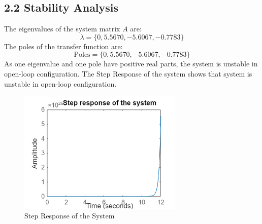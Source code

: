 \documentclass[a4paper,12pt]{article}
\begin{document}
\subsection*{2.2 Stability Analysis}
The eigenvalues of the system matrix \(A\) are:
\[
\lambda = \{0, 5.5670, -5.6067, -0.7783\}
\]
The poles of the transfer function are:
\[
\text{Poles} = \{0, 5.5670, -5.6067, -0.7783\}
\]
As one eigenvalue and one pole have positive real parts, the system is unstable in open-loop configuration.
The Step Response of the system shows that system is unstable in open-loop configuration.
\begin{figure}[h!]
    \centering
    \includegraphics[width=0.7\textwidth]{step.png} %
    \caption{Step Response of the System}
\end{figure}
\end{document}

